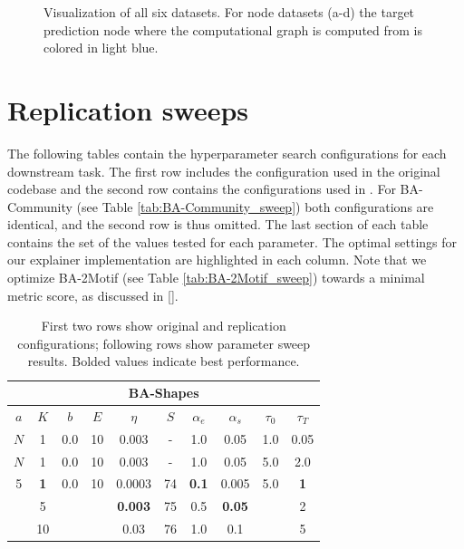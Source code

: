 \begin{figure}[H]
    \caption[Visualization of original PGExplainer datasets]{Visualization of all six datasets. For node datasets (a-d) the target prediction node where the computational graph is computed from is colored in light blue.}
\end{figure}

\section{Replication sweeps}
\label{sec:sweeps}
The following tables contain the hyperparameter search configurations for each downstream task. The first row includes the configuration used in the original codebase \cite{luo2020parameterized} and the second row contains the configurations used in \cite{holdijk2021re}. For BA-Community (see Table \ref{tab:BA-Community_sweep}) both configurations are identical, and the second row is thus omitted. The last section of each table contains the set of the values tested for each parameter. The optimal settings for our explainer implementation are highlighted in each column. Note that we optimize BA-2Motif (see Table \ref{tab:BA-2Motif_sweep}) towards a minimal metric score, as discussed in \ref{}.

\begin{table}[h]
  \centering
  \scriptsize
  \begin{tabular}{|c|c|c|c|c|c|c|c|c|c|}
  \hline
  \multicolumn{10}{|c|}{\textbf{BA-Shapes}} \\ \hline
  $a$ & $K$ & $b$ & $E$ & $\eta$ & $S$ & $\alpha_e$ & $\alpha_s$ & $\tau_0$ & $\tau_T$ \\ \hline
  $N$ & 1 & 0.0 & 10 & 0.003 & - & 1.0 & 0.05 & 1.0 & 0.05 \\ \hline
  $N$ & 1 & 0.0 & 10 & 0.003 & - & 1.0 & 0.05 & 5.0 & 2.0 \\ \hline
  5 & \textbf{1} & 0.0 & 10 & 0.0003 & 74 & \textbf{0.1} & 0.005 & 5.0 & \textbf{1} \\
   & 5 &  &  & \textbf{0.003} & 75 & 0.5 & \textbf{0.05} &  & 2 \\
   & 10 &  &  & 0.03 & 76 & 1.0 & 0.1 &  & 5 \\ \hline
  \end{tabular}
  \caption[BA-Shapes Sweep]{First two rows show original and replication configurations; following rows show parameter sweep results. Bolded values indicate best performance.}
\end{table}

